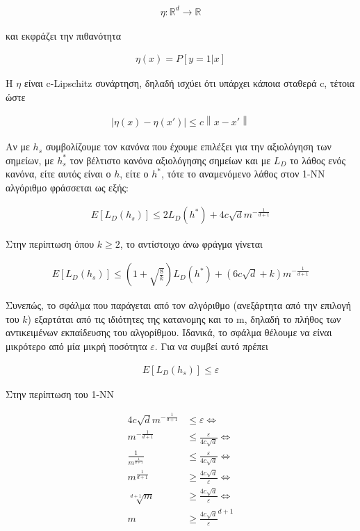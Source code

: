 \documentclass[12pt]{article}
\newcommand{\R}{\mathbb{R}}
\newcommand{\norm}[1]{\left\lVert#1\right\rVert}
\begin{document}
\begin{align*}
	η: \R^d \rightarrow \R
\end{align*}

και εκφράζει την πιθανότητα 

\begin{align*}
	η(x) = P[y = 1 | x]
\end{align*}

Η \(η\) είναι c-Lipschitz συνάρτηση, δηλαδή ισχύει ότι υπάρχει κάποια σταθερά c, τέτοια ώστε

\begin{align*}
	|η(x) - η(x')| \leq c \norm{x-x'}
\end{align*}  

Αν με \(h_s\) συμβολίζουμε τον κανόνα που έχουμε επιλέξει για την αξιολόγηση των σημείων, με \(h_{s}^*\) τον βέλτιστο κανόνα αξιολόγησης σημείων και με \(L_D\) το λάθος ενός κανόνα, είτε αυτός είναι ο \(h\), είτε ο \(h^*\), τότε το αναμενόμενο λάθος στον 1-NN αλγόριθμο φράσσεται ως εξής:

\begin{align*}
	E[L_D(h_s)] \leq 2 L_D(h^*) + 4c \sqrt{d} m^{- \frac{1}{d+1}}
\end{align*} 

Στην περίπτωση όπου \(k \geq 2\), το αντίστοιχο άνω φράγμα γίνεται 

\begin{align*}
	E[L_D(h_s)] \leq (1 + \sqrt{\frac{8}{k}}) L_D(h^*) + (6c \sqrt{d} + k) m^{- \frac{1}{d+1}}
\end{align*} 

Συνεπώς, το σφάλμα που παράγεται από τον αλγόριθμο (ανεξάρτητα από την επιλογή του \(k\)) εξαρτάται από τις ιδιότητες της κατανομης και το m, δηλαδή το πλήθος των αντικειμένων εκπαίδευσης του αλγορίθμου. Ιδανικά, το σφάλμα θέλουμε να είναι μικρότερο από μία μικρή ποσότητα \(ε\). Για να συμβεί αυτό πρέπει

\begin{align*}
	E[L_D(h_s)] \leq ε
\end{align*}

Στην περίπτωση του 1-ΝΝ

\begin{align*}
	4c \sqrt{d} m^{- \frac{1}{d+1}} &\leq ε \Leftrightarrow \\
	m^{- \frac{1}{d+1}} &\leq \frac{ε}{4c \sqrt{d}} \Leftrightarrow \\
	\frac{1}{m^{\frac{1}{d+1}}} &\leq \frac{ε}{4c \sqrt{d}} \Leftrightarrow \\
	m^{\frac{1}{d+1}} &\geq \frac{4c \sqrt{d} }{ε}\Leftrightarrow \\
	\sqrt[d+1]{m} &\geq \frac{4c \sqrt{d} }{ε} \Leftrightarrow \\
	m &\geq \frac{4c \sqrt{d}}{ε}^{d+1} 
\end{align*}
\end{document}
